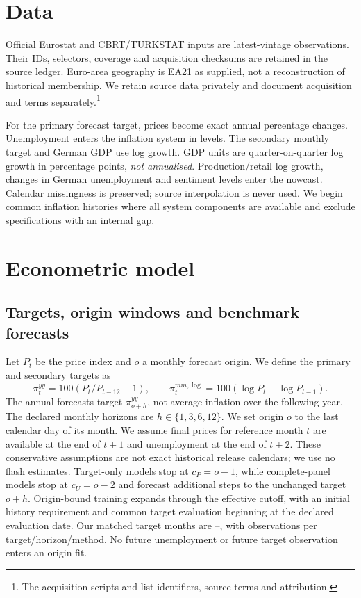 \section{Data}

Official Eurostat and CBRT/TURKSTAT inputs are latest-vintage observations. Their IDs, selectors, coverage and acquisition checksums are retained in the source ledger. Euro-area geography is EA21 as supplied, not a reconstruction of historical membership. We retain source data privately and document acquisition and terms separately.\footnote{The acquisition scripts and  list identifiers, source terms and attribution.}

For the primary forecast target, prices become exact annual percentage changes. Unemployment enters the inflation system in levels. The secondary monthly target and German GDP use log growth. GDP units are quarter-on-quarter log growth in percentage points, \emph{not annualised}. Production/retail log growth, changes in German unemployment and sentiment levels enter the nowcast. Calendar missingness is preserved; source interpolation is never used. We begin common inflation histories where all system components are available and exclude specifications with an internal gap.
\section{Econometric model}
\subsection{Targets, origin windows and benchmark forecasts}
Let $P_t$ be the price index and $o$ a monthly forecast origin. We define the primary and secondary targets as
\begin{equation}
 \pi_t^{yy}=100(P_t/P_{t-12}-1),\qquad
 \pi_t^{mm,\log}=100(\log P_t-\log P_{t-1}).
\end{equation}
The annual forecasts target $\pi_{o+h}^{yy}$, not average inflation over the following year. The declared monthly horizons are $h\in\{1,3,6,12\}$. We set origin $o$ to the last calendar day of its month. We assume final prices for reference month $t$ are available at the end of $t+1$ and unemployment at the end of $t+2$. These conservative assumptions are not exact historical release calendars; we use no flash estimates. Target-only models stop at $c_P=o-1$, while complete-panel models stop at $c_U=o-2$ and forecast additional steps to the unchanged target $o+h$. Origin-bound training expands through the effective cutoff, with an initial history requirement and common target evaluation beginning at the declared evaluation date. Our matched target months are \EvalStart{}--\EvalEnd{}, with \EvalN{} observations per target/horizon/method. No future unemployment or future target observation enters an origin fit.

